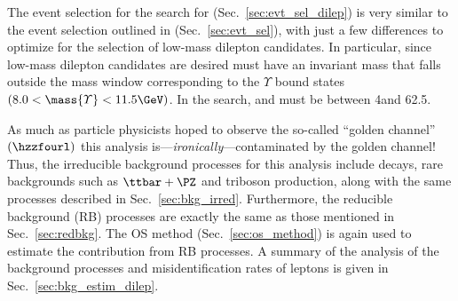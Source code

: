 The event selection for the search for \PZD (Sec.~\ref{sec:evt_sel_dilep}) is very similar to the event selection outlined in (Sec.~\ref{sec:evt_sel}), with just a few differences to optimize for the selection of low-mass dilepton candidates.
In particular, since low-mass dilepton candidates are desired must have an invariant mass that falls outside the mass window corresponding to the $\varUpsilon$ \bbbar bound states $\left( 8.0 < \mass{\varUpsilon} < 11.5\GeV \right)$. 
In the \zdzd search, \mZone and \mZtwo must be between 4\GeV and 62.5\GeV.

As much as particle physicists hoped to observe the so-called ``golden channel'' $\left( \hzzfourl \right)$
this analysis is---\emph{ironically}---contaminated by the golden channel!
Thus, the irreducible background processes for this analysis include \htofourl decays, rare backgrounds such as $\ttbar + \PZ$ and triboson production, along with the same processes described in Sec.~\ref{sec:bkg_irred}.
Furthermore, the reducible background (RB) processes are exactly the same as those mentioned in Sec.~\ref{sec:redbkg}.
The OS method (Sec.~\ref{sec:os_method}) is again used to estimate the contribution from RB processes.
A summary of the analysis of the background processes and misidentification rates of leptons is given in Sec.~\ref{sec:bkg_estim_dilep}.

